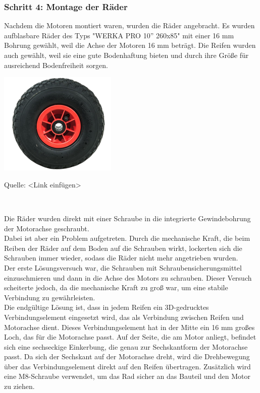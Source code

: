 \documentclass[ngerman,12pt,a4paper]{article}
\begin{document}
	\subsubsection*{Schritt 4: Montage der Räder}
	
	Nachdem die Motoren montiert waren, wurden die Räder angebracht. Es wurden aufblasbare Räder des Typs "WERKA PRO 10'' 260x85" mit einer 16 mm Bohrung gewählt, weil die Achse der Motoren 16 mm beträgt. Die Reifen wurden auch gewählt, weil sie eine gute Bodenhaftung bieten und durch ihre Größe für ausreichend Bodenfreiheit sorgen. 
	
	\begin{center} 
		\begin{minipage}[t]{0.39\textwidth}
			\includegraphics{Pictures/Rad}
			\label{fig: Rad}
			\vspace{-10pt}
			\begin{center}
				\par\small Quelle: <Link einfügen>
			\end{center}
		\end{minipage} \\[0.75cm]
	\end{center}
	Die Räder wurden direkt mit einer Schraube in die integrierte Gewindebohrung der Motorachse geschraubt. \\[0.5cm]
	Dabei ist aber ein Problem aufgetreten. Durch die mechanische Kraft, die beim Reiben der Räder auf dem Boden auf die Schrauben wirkt, lockerten sich die Schrauben immer wieder, sodass die Räder nicht mehr angetrieben wurden.\\[0.5cm]
	Der erste Lösungsversuch war, die Schrauben mit Schraubensicherungsmittel einzuschmieren und dann in die Achse des Motors zu schrauben. Dieser Versuch scheiterte jedoch, da die mechanische Kraft zu groß war, um eine stabile Verbindung zu gewährleisten.\\[0.5cm]
	Die endgültige Lösung ist, dass in jedem Reifen ein 3D-gedrucktes Verbindungselement eingesetzt wird, das als Verbindung zwischen Reifen und Motorachse dient. Dieses Verbindungselement hat in der Mitte ein 16 mm großes Loch, das für die Motorachse passt. Auf der Seite, die am Motor anliegt, befindet sich eine sechseckige Einkerbung, die genau zur Sechskantform der Motorachse passt. Da sich der Sechskant auf der Motorachse dreht, wird die Drehbewegung über das Verbindungselement direkt auf den Reifen übertragen. Zusätzlich wird eine M8-Schraube verwendet, um das Rad sicher an das Bauteil und den Motor zu ziehen.  
\end{document}
